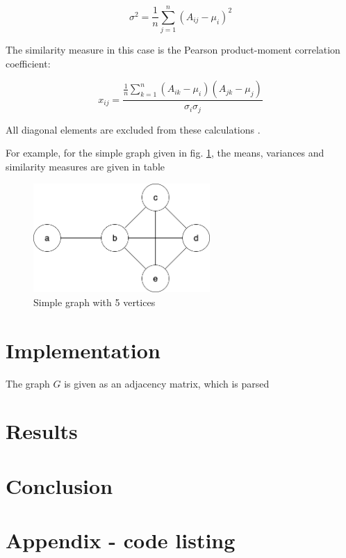 \documentclass[12pt,a4paper]{article}
\begin{document}
$$ \sigma^2 = \frac{1}{n} \sum_{j=1}^{n} (A_{ij} - \mu_i)^2 $$

The similarity measure in this case is the Pearson product-moment
correlation coefficient:

$$ x_{ij} = \frac{\frac{1}{n}\sum_{k=1}^{n}(A_{ik} -
  \mu_i)(A_{jk}-\mu_j)}{\sigma_i\sigma_j} $$

All diagonal elements are excluded from these calculations
\cite[p.~369]{socionetwork}.

For example, for the simple graph given in
fig. \ref{fig:simple_graph}, the means, variances and similarity
measures are given in table

\begin{figure}[ht!]
  \centering
  \includegraphics[width=0.6\textwidth]{img/simple_graph.png}
  \caption{Simple graph with 5 vertices}
  \label{fig:simple_graph}
\end{figure}



\section{Implementation}

The graph $ G $ is given as an adjacency matrix, which is parsed

\section{Results}

\section{Conclusion}




\nocite{*}

\appendix
\section{Appendix - code listing}

\inputminted{python}{../src/main.py}

\end{document}

